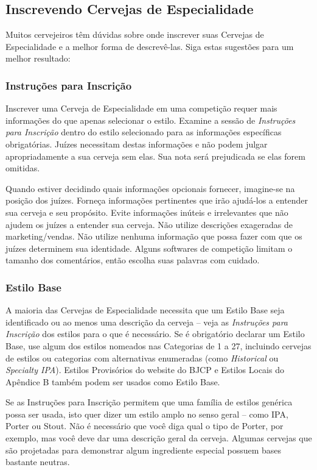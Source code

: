 \subsection*{Inscrevendo Cervejas de Especialidade}
Muitos cervejeiros têm dúvidas sobre onde inscrever suas Cervejas de Especialidade e a melhor forma de descrevê-las. Siga estas sugestões para um melhor resultado:
\subsubsection*{Instruções para Inscrição}
Inscrever uma Cerveja de Especialidade em uma competição requer mais informações do que apenas selecionar o estilo. Examine a sessão de \textit{Instruções para Inscrição} dentro do estilo selecionado para as informações específicas obrigatórias. Juízes necessitam destas informações e não podem julgar apropriadamente a sua cerveja sem elas. Sua nota será prejudicada se elas forem omitidas.

Quando estiver decidindo quais informações opcionais fornecer, imagine-se na posição dos juízes. Forneça informações pertinentes que irão ajudá-los a entender sua cerveja e seu propósito. Evite informações inúteis e irrelevantes que não ajudem os juízes a entender sua cerveja. Não utilize descrições exageradas de marketing/vendas. Não utilize nenhuma informação que possa fazer com que os juízes determinem sua identidade. Alguns softwares de competição limitam o tamanho dos comentários, então escolha suas palavras com cuidado.

\subsubsection*{Estilo Base}
A maioria das Cervejas de Especialidade necessita que um Estilo Base seja identificado ou ao menos uma descrição da cerveja – veja as \textit{Instruções para Inscrição} dos estilos para o que é necessário. Se é obrigatório declarar um Estilo Base, use algum dos estilos nomeados nas Categorias de 1 a 27, incluindo cervejas de estilos ou categorias com alternativas enumeradas (como \textit{Historical} ou \textit{Specialty IPA}). Estilos Provisórios do website do BJCP e Estilos Locais do Apêndice B também podem ser usados como Estilo Base.

Se as Instruções para Inscrição permitem que uma família de estilos genérica possa ser usada, isto quer dizer um estilo amplo no senso geral – como IPA, Porter ou Stout. Não é necessário que você diga qual o tipo de Porter, por exemplo, mas você deve dar uma descrição geral da cerveja. Algumas cervejas que são projetadas para demonstrar algum ingrediente especial possuem bases bastante neutras.


